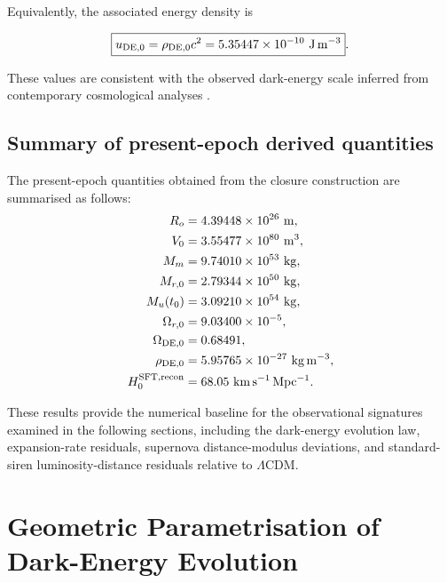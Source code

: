 \documentclass[12pt]{article}
\begin{document}
Equivalently, the associated energy density is

\begin{equation}
\boxed{
u_{\rm DE,0}
=
\rho_{\rm DE,0}c^2
=
5.35447\times10^{-10}
~\mathrm{J\,m^{-3}}
}.
\end{equation}

These values are consistent with the observed dark-energy scale inferred
from contemporary cosmological analyses
\cite{Weinberg1989,Carroll2001,Padmanabhan2003,Planck2020,DESI2024}.

\subsection{Summary of present-epoch derived quantities}
\label{subsec:present_epoch_summary}

The present-epoch quantities obtained from the closure construction are
summarised as follows:
\begin{align}
R_o &= 4.39448\times10^{26}~\mathrm{m},\\
V_0 &= 3.55477\times10^{80}~\mathrm{m^3},\\
M_m &= 9.74010\times10^{53}~\mathrm{kg},\\
M_{r,0} &= 2.79344\times10^{50}~\mathrm{kg},\\
M_u(t_0) &= 3.09210\times10^{54}~\mathrm{kg},\\
\Omega_{r,0} &= 9.03400\times10^{-5},\\
\Omega_{\rm DE,0} &= 0.68491,\\
\rho_{\rm DE,0} &= 5.95765\times10^{-27}~\mathrm{kg\,m^{-3}},\\
H_0^{\rm SFT,recon} &= 68.05~\mathrm{km\,s^{-1}\,Mpc^{-1}}.
\end{align}

These results provide the numerical baseline for the observational signatures
examined in the following sections, including the dark-energy evolution law,
expansion-rate residuals, supernova distance-modulus deviations, and
standard-siren luminosity-distance residuals relative to $\Lambda$CDM.


\section{Geometric Parametrisation of Dark-Energy Evolution}
\label{sec:geom_alpha}
\end{document}

